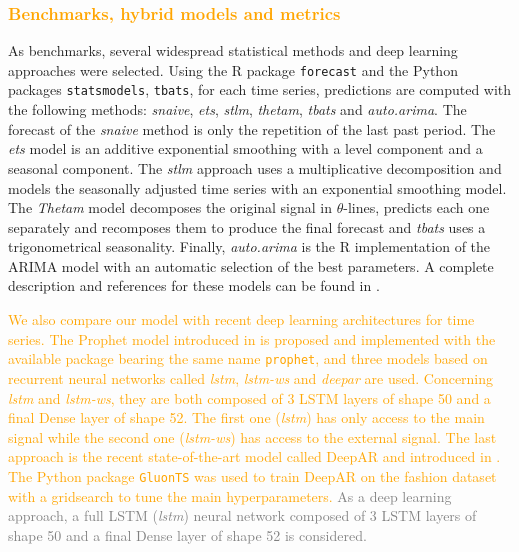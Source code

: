 \documentclass[10pt]{article} %
\begin{document}
\textcolor{orange}{\subsubsection{Benchmarks, hybrid models and metrics}}
\label{sec:fashiontraining}

As benchmarks, several widespread statistical methods and deep learning approaches were selected. Using the R package \texttt{forecast} and the Python packages \texttt{statsmodels},  \texttt{tbats}, for each time series, predictions are computed with the following methods: \textit{snaive}, \textit{ets}, \textit{stlm}, \textit{thetam}, \textit{tbats} and \textit{auto.arima}. The forecast of the \textit{snaive} method is only the repetition of the last past period. The \textit{ets} model is an additive exponential smoothing with a level component and a seasonal component. The \textit{stlm} approach uses a multiplicative decomposition and models the seasonally adjusted time series with an exponential smoothing model. The \textit{Thetam} model decomposes the original signal in $\theta$-lines, predicts each one separately and recomposes them to produce the final forecast and \textit{tbats} uses a trigonometrical seasonality. Finally, \textit{auto.arima} is the R implementation of the ARIMA model with an automatic selection of the best parameters. A complete description and references for these models can be found in \citet{hyndman2020}. 

\textcolor{orange}{We also compare our model with recent deep learning architectures for time series. The Prophet model introduced in \citet{Taylor2017} is proposed and implemented with the available package bearing the same name \texttt{prophet}, and three models based on recurrent neural networks called \textit{lstm}, \textit{lstm-ws} and \textit{deepar} are used. Concerning \textit{lstm} and \textit{lstm-ws}, they are both composed of 3 LSTM layers of shape 50 and a final Dense layer of shape 52. The first one (\textit{lstm}) has only access to the main signal while the second one (\textit{lstm-ws}) has access to the external signal. The last approach is the recent state-of-the-art model called DeepAR and introduced in \citet{salinas2020}. The Python package \texttt{GluonTS} \citep{Alexandrov2020} was used to train DeepAR on the fashion dataset with a gridsearch to tune the main hyperparameters.} \textcolor{gray}{As a deep learning approach, a full LSTM (\textit{lstm}) neural network composed of 3 LSTM layers of shape 50 and a final Dense layer of shape 52 is considered.}
\end{document}
